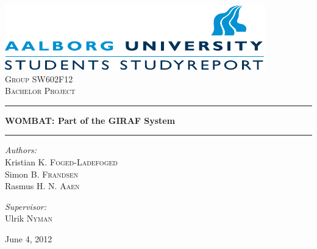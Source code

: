 \begin{titlepage}

\begin{center}

\includegraphics[width=\textwidth]{Images/aau_logo_en.pdf}\\[1cm]    

\textsc{\LARGE Group SW602F12}\\[1.5cm]

\textsc{\Large Bachelor Project}\\[0.5cm]


\hrule
\vspace{0.4cm}

{ \huge \bfseries WOMBAT: Part of the GIRAF System}\\[0.4cm]

\hrule
\vspace{1.5cm}

\begin{minipage}{0.55\textwidth}
\begin{flushleft} \large
\vspace{1.25cm}
\textit{Authors:}\\
Kristian K. \textsc{Foged-Ladefoged}\\

Simon B. \textsc{Frandsen}\\

Rasmus H. N. \textsc{Aaen}
\end{flushleft}
\end{minipage}
\begin{minipage}{0.35\textwidth}
\begin{flushright} \large
\textit{Supervisor:} \\
Ulrik \textsc{Nyman}
\end{flushright}
\end{minipage}

\vfill

{\large June 4, 2012}

\end{center}

\end{titlepage}
